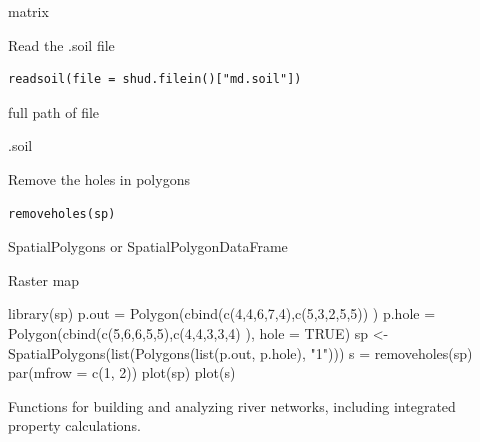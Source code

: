 \documentclass[a4paper]{book}
\begin{document}
%
\begin{Value}
matrix
\end{Value}
%
\begin{Description}\relax
Read the .soil file
\end{Description}
%
\begin{Usage}
\begin{verbatim}
readsoil(file = shud.filein()["md.soil"])
\end{verbatim}
\end{Usage}
%
\begin{Arguments}
\begin{ldescription}
\item[\code{file}] full path of file
\end{ldescription}
\end{Arguments}
%
\begin{Value}
.soil
\end{Value}
%
\begin{Description}\relax
Remove the holes in polygons
\end{Description}
%
\begin{Usage}
\begin{verbatim}
removeholes(sp)
\end{verbatim}
\end{Usage}
%
\begin{Arguments}
\begin{ldescription}
\item[\code{sp}] SpatialPolygons or SpatialPolygonDataFrame
\end{ldescription}
\end{Arguments}
%
\begin{Value}
Raster map
\end{Value}
%
\begin{Examples}
\begin{ExampleCode}
library(sp)
p.out = Polygon(cbind(c(4,4,6,7,4),c(5,3,2,5,5))  )
p.hole = Polygon(cbind(c(5,6,6,5,5),c(4,4,3,3,4) ), hole = TRUE)
sp <- SpatialPolygons(list(Polygons(list(p.out, p.hole), "1")))
s = removeholes(sp)
par(mfrow = c(1, 2))
plot(sp)
plot(s)
\end{ExampleCode}
\end{Examples}
%
\begin{Description}\relax
Functions for building and analyzing river networks, including
integrated property calculations.
\end{Description}
\end{document}
